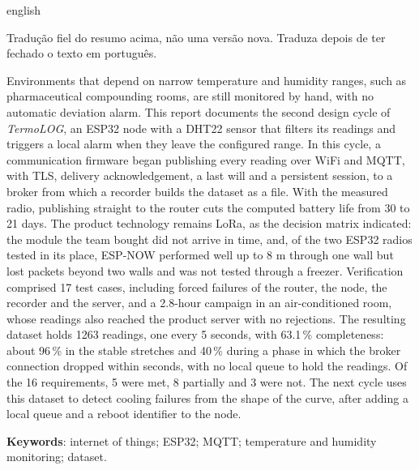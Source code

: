 \begin{resumo}[Abstract]
\begin{otherlanguage*}{english}
\begin{orientacao}
Tradução fiel do resumo acima, não uma versão nova. Traduza depois de
ter fechado o texto em português.
\end{orientacao}

Environments that depend on narrow temperature and humidity ranges,
such as pharmaceutical compounding rooms, are still monitored by hand, with no
automatic deviation alarm. This report documents the second design
cycle of \emph{TermoLOG}, an ESP32 node with a DHT22 sensor that filters
its readings and triggers a local alarm when they leave the configured
range. In this cycle, a communication firmware began publishing every
reading over WiFi and MQTT, with TLS, delivery acknowledgement, a last will and a persistent session, to a broker from
which a recorder builds the dataset as a file. With the measured radio,
publishing straight to the router cuts the computed battery life from
30 to 21 days. The product technology remains LoRa, as the decision
matrix indicated: the module the team bought did not arrive in time,
and, of the two ESP32 radios tested in its place, ESP-NOW performed
well up to 8 m through one wall but lost packets beyond two walls and
was not tested through a freezer. Verification comprised
17 test cases, including forced failures of the router, the node, the
recorder and the server, and a 2.8-hour campaign in an air-conditioned room, whose
readings also reached the product server with no rejections. The resulting dataset holds 1263 readings, one
every 5 seconds, with 63.1\,\% completeness: about 96\,\% in the stable
stretches and 40\,\% during a phase in which the broker connection
dropped within seconds, with no local queue to hold the readings. Of
the 16 requirements, 5 were met, 8 partially and 3 were not. The next
cycle uses this dataset to detect cooling failures from the shape of the curve,
after adding a local queue and a reboot identifier to the node.

\textbf{Keywords}: internet of things; ESP32; MQTT; temperature and
humidity monitoring; dataset.
\end{otherlanguage*}
\end{resumo}
